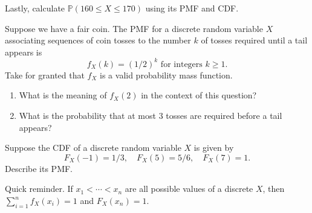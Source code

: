 \documentclass[../main.tex]{subfiles}
\begin{document}
Lastly, calculate \(\mathbb{P}(160 \le X \le 170)\) using its PMF and CDF.

\blanks*

\clearpage

\begin{example} \label{ex:drv-coin-tosses}
  Suppose we have a fair coin. The PMF for a discrete random variable \(X\) associating sequences of coin tosses to the number \(k\) of tosses required until a tail appears is
  \[
    f_{X}(k) = (1/2)^{k} \text{ for integers } k \ge 1.
  \]
  Take for granted that \(f_{X}\) is a valid probability mass function. 

  \begin{enumerate}[wide]
    \item What is the meaning of \(f_{X}(2)\) in the context of this question?


    \item What is the probability that at most \(3\) tosses are required before a tail appears?

  \end{enumerate}
\end{example}

\begin{exercise} \label{ex:drv-cdf-to-pmf}
  Suppose the CDF of a discrete random variable \(X\) is given by
  \[
    F_{X}(-1) = 1/3, \quad F_{X}(5) = 5/6, \quad F_{X}(7) = 1.
  \]
  Describe its PMF.

  \blanks*
\end{exercise}
\clearpage

%
%

\faStar{} Quick reminder. If \(x_{1} < \cdots < x_{n}\) are all possible values of a discrete \(X\), then \(\sum_{i=1}^{n} f_{X}(x_{i}) = 1\) and \(F_{X}(x_{n}) = 1\).
\end{document}
